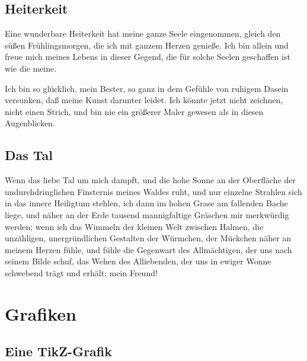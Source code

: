 		\subsection{Heiterkeit}

		\begin{frame}{\insertsectionhead}{\insertsubsectionhead}
			Eine wunderbare Heiterkeit hat meine ganze Seele eingenommen, gleich den süßen Frühlingsmorgen, die ich mit ganzem Herzen genieße.
			Ich bin allein und freue mich meines Lebens in dieser Gegend, die für solche Seelen geschaffen ist wie die meine.

			Ich bin so glücklich, mein Bester, so ganz in dem Gefühle von ruhigem Dasein versunken, daß meine Kunst darunter leidet.
			Ich könnte jetzt nicht zeichnen, nicht einen Strich, und bin nie ein größerer Maler gewesen als in diesen Augenblicken.
		\end{frame}

		\subsection{Das Tal}

		\begin{frame}{\insertsectionhead}{\insertsubsectionhead}
			Wenn das liebe Tal um mich dampft, und die hohe Sonne an der Oberfläche der undurchdringlichen Finsternis meines Waldes ruht, und nur einzelne Strahlen sich in das innere Heiligtum stehlen, ich dann im hohen Grase am fallenden Bache liege, und näher an der Erde tausend mannigfaltige Gräschen mir merkwürdig werden; wenn ich das Wimmeln der kleinen Welt zwischen Halmen, die unzähligen, unergründlichen Gestalten der Würmchen, der Mückchen näher an meinem Herzen fühle, und fühle die Gegenwart des Allmächtigen, der uns nach seinem Bilde schuf, das Wehen des Alliebenden, der uns in ewiger Wonne schwebend trägt und erhält; mein Freund!
		\end{frame}


	\section{Grafiken}

		\subsection{Eine TikZ-Grafik}

